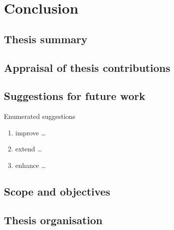%
%


\chapter{Conclusion}
\vspace{-2em}
\minitoc

\startarabicpagenumbering %


\blindtext

\section{Thesis summary}

\blindtext

\section{Appraisal of thesis contributions}

\blindtext

\section{Suggestions for future work}
Enumerated suggestions
\begin{enumerate}
\item improve \ldots
\item extend \ldots
\item enhance \ldots
\end{enumerate}

\Blindtext

\section{Scope and objectives}

\Blindtext

\section{Thesis organisation}

\Blindtext